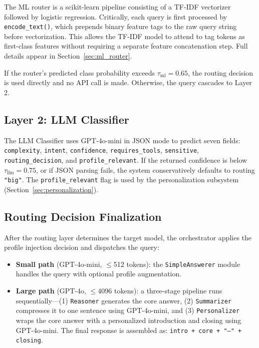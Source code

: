 \documentclass{article}
\newcommand{\smallmdl}{GPT-4o-mini}
\newcommand{\largemdl}{GPT-4o}
\begin{document}
The ML router is a scikit-learn \citep{pedregosa2011sklearn} pipeline
consisting of a TF-IDF vectorizer followed by logistic regression.
Critically, each query is first processed by \texttt{encode\_text()}, which
prepends binary feature tags to the raw query string before vectorization.
This allows the TF-IDF model to attend to tag tokens as first-class features
without requiring a separate feature concatenation step. Full details appear
in Section~\ref{sec:ml_router}.

If the router's predicted class probability exceeds $\tau_\text{ml} = 0.65$,
the routing decision is used directly and no API call is made. Otherwise, the
query cascades to Layer 2.

\subsection{Layer 2: LLM Classifier}
\label{sec:layer2}

The LLM Classifier uses \smallmdl{} in JSON mode to predict seven fields:
\texttt{complexity}, \texttt{intent}, \texttt{confidence},
\texttt{requires\_tools}, \texttt{sensitive}, \texttt{routing\_decision},
and \texttt{profile\_relevant}. If the returned confidence is below
$\tau_\text{llm} = 0.75$, or if JSON parsing fails, the system conservatively
defaults to routing \texttt{"big"}. The \texttt{profile\_relevant} flag is
used by the personalization subsystem (Section~\ref{sec:personalization}).

\subsection{Routing Decision Finalization}
\label{sec:finalization}

After the routing layer determines the target model, the orchestrator
applies the profile injection decision and dispatches the query:
\begin{itemize}
    \item \textbf{Small path} (\smallmdl{}, $\leq$512 tokens): the
    \texttt{SimpleAnswerer} module handles the query with optional profile
    augmentation.
    \item \textbf{Large path} (\largemdl{}, $\leq$4096 tokens):
    a three-stage pipeline runs sequentially---(1) \texttt{Reasoner}
    generates the core answer, (2) \texttt{Summarizer} compresses it to
    one sentence using \smallmdl{}, and (3) \texttt{Personalizer} wraps
    the core answer with a personalized introduction and closing using
    \smallmdl{}. The final response is assembled as:
    \texttt{intro + core + "---" + closing}.
\end{itemize}
\end{document}
